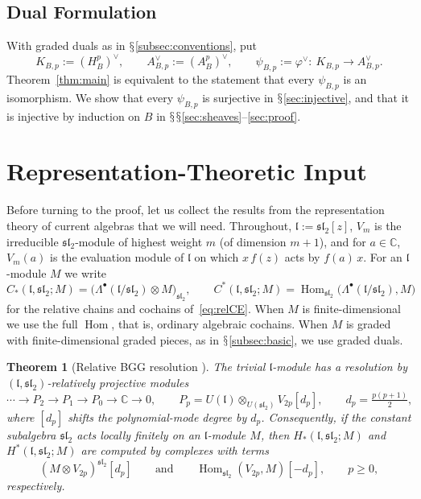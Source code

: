 \documentclass[11pt]{amsart}
\numberwithin{equation}{section}
\renewcommand{\S}{\mbox{$\mathsection$}}
\newtheorem{theorem}{Theorem}[section]
\theoremstyle{definition}
\theoremstyle{remark}
\newcommand{\C}{\mathbb{C}}
\newcommand{\sltwo}{\mathfrak{sl}_2}
\newcommand{\lie}{\mathfrak{l}}
\newcommand{\Hom}{\operatorname{Hom}}
\begin{document}
\subsection{Dual Formulation}\label{subsec:dual}
With graded duals as in \S\ref{subsec:conventions}, put
\begin{equation}\label{eq:psi}
K_{B,p}:=(H_B^p)^\vee,\qquad A^\vee_{B,p}:=(A_B^p)^\vee,\qquad
\psi_{B,p}:=\varphi^\vee:\ K_{B,p}\longrightarrow A^\vee_{B,p}.
\end{equation}
Theorem~\ref{thm:main} is equivalent to the statement that every $\psi_{B,p}$ is an isomorphism. We show that every $\psi_{B,p}$ is surjective in \S\ref{sec:injective}, and that it is injective by induction on $B$ in \S\S\ref{sec:sheaves}--\ref{sec:proof}.

\section{Representation-Theoretic Input}\label{sec:inputs}

Before turning to the proof, let us collect the results from the representation theory of current algebras that we will need. Throughout, $\lie:=\sltwo[z]$, $V_m$ is the irreducible $\sltwo$-module of highest weight $m$ (of dimension $m+1$), and for $a\in\C$, $V_m(a)$ is the evaluation module of $\lie$ on which $x\,f(z)$ acts by $f(a)\,x$. For an $\lie$-module $M$ we write
\begin{equation}\label{eq:rel-chains-l}
C_*(\lie,\sltwo;M)=\bigl(\Lambda^\bullet(\lie/\sltwo)\otimes M\bigr)_{\sltwo},\qquad
C^*(\lie,\sltwo;M)=\Hom_{\sltwo}\bigl(\Lambda^\bullet(\lie/\sltwo),M\bigr)
\end{equation}
for the relative chains and cochains of~\eqref{eq:relCE}. When $M$ is finite-dimensional we use the full $\Hom$, that is, ordinary algebraic cochains. When $M$ is graded with finite-dimensional graded pieces, as in \S\ref{subsec:basic}, we use graded duals.

\begin{theorem}[{Relative BGG resolution \cite{GL76,Lep79}}]\label{thm:BGG}
The trivial $\lie$-module has a resolution by $(\lie,\sltwo)$-relatively projective modules
\begin{equation}\label{eq:BGG-resolution}
\cdots\to P_2\to P_1\to P_0\to\C\to0,\qquad
P_p=U(\lie)\otimes_{U(\sltwo)}V_{2p}[d_p],\qquad d_p=\tfrac{p(p+1)}2,
\end{equation}
where $[d_p]$ shifts the polynomial-mode degree by $d_p$. Consequently, if the constant subalgebra $\sltwo$ acts locally finitely on an $\lie$-module $M$, then $H_*(\lie,\sltwo;M)$ and $H^*(\lie,\sltwo;M)$ are computed by complexes with terms
\begin{equation}\label{eq:BGG-terms}
(M\otimes V_{2p})^{\sltwo}[d_p]\qquad\text{and}\qquad\Hom_{\sltwo}(V_{2p},M)[-d_p],\qquad p\ge0,
\end{equation}
respectively.
\end{theorem}
\end{document}

